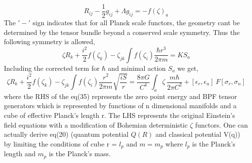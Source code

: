 \documentclass{article}
\begin{document}
\begin{equation}
  R_{ij} - \frac{1}{2} g_{ij} + \Lambda g_{ij} =- f(\zeta)_a 
\end{equation}
The $'-'$ sign indicates that for all Planck scale functors, the geometry cant be determined by the tensor bundle beyond a conserved scale symmetry. Thus the following symmetry is allowed,
\begin{equation}
     \zeta R_{k} + \frac{i^2}{2} f(\zeta_k) - \zeta_{jk} \int f(\zeta_i) \frac{\hbar r^3}{2\pi m} = K S_a 
\end{equation}
Including the corrected term for $\hbar$ and minimal action $S_a$ we get,
\begin{equation}
      \zeta R_{k} + \frac{i^2}{2} f(\zeta_k) - \zeta_{jk} \int f(\zeta_i) \frac{r^2}{2 \pi m} \sqrt{\frac{iS}{r}} = \frac{8 \pi G}{C^4} \int_{a} \zeta \ \frac{m \hbar}{2 \pi C^2} + [\epsilon_r , \epsilon_n] \ F [\sigma_r ,\sigma_n] 
\end{equation}
where the RHS of the eq(35) represents the zero point energy and BPF tensor generators which is represented by functions of n dimensional manifolds and a cube of effective Planck's length r. The LHS represents the original Einstein's field equations with a modification of Bohemian deterministic $\zeta$ functors. One can actually derive eq(20) (quantum potential $Q(R)$ and classical potential V(q)) by limiting the conditions of cube r = $l_p$ and $m = m_p$ where $l_p$ is the Planck's length and $m_p$ is the Planck's mass.
\end{document}

